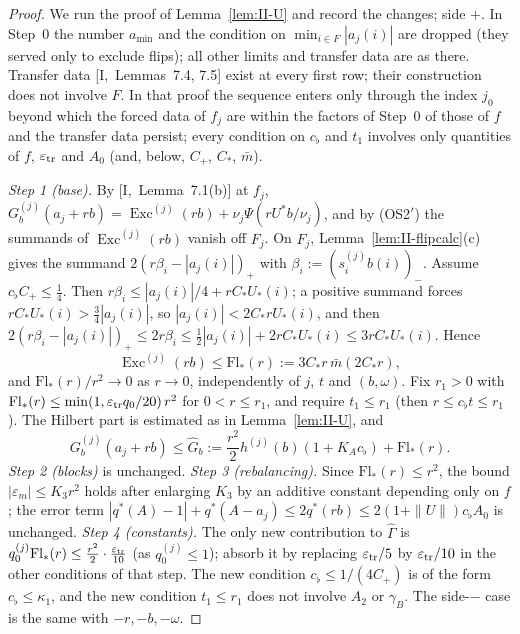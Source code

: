 \documentclass[10pt]{amsart}
\theoremstyle{definition}
\theoremstyle{remark}
\newcommand{\Exc}{\operatorname{Exc}}
\begin{document}
\begin{proof}
We run the proof of Lemma~\ref{lem:II-U} and record the changes; side $+$.
In Step~0 the number $a_{\min}$ and the condition on
$\min_{i\in F}|a_j(i)|$ are dropped (they served only to exclude flips); all
other limits and transfer data are as there.  Transfer data
[I,~Lemmas~7.4, 7.5] exist at every first row; their construction does not
involve $F$.  In that proof the sequence enters only through the index
$j_0$ beyond which the forced data of $f_j$ are within the factors of Step~0
of those of $f$ and the transfer data persist; every condition on $c_\flat$
and $t_1$ involves only quantities of $f$, $\varepsilon_{\rm tr}$ and $A_0$
(and, below, $C_+$, $C_*$, $\bar m$).

\emph{Step 1 (base).}  By [I,~Lemma~7.1(b)] at $f_j$, $G^{(j)}_b(a_j+rb)=
\Exc^{(j)}(rb)+\nu_j\Psi(rU^*b/\nu_j)$, and by (OS2$'$) the summands of
$\Exc^{(j)}(rb)$ vanish off $F_j$.  On $F_j$, Lemma~\ref{lem:II-flipcalc}(c)
gives the summand $2(r\beta_i-|a_j(i)|)_+$ with $\beta_i:=(s^{(j)}_ib(i))_-$.
Assume $c_\flat C_+\le\frac14$.  Then $r\beta_i\le|a_j(i)|/4+rC_*U_*(i)$; a
positive summand forces $rC_*U_*(i)>\frac34|a_j(i)|$, so $|a_j(i)|<2C_*rU_*(i)$,
and then $2(r\beta_i-|a_j(i)|)_+\le2r\beta_i\le\frac12|a_j(i)|+2rC_*U_*(i)\le
3rC_*U_*(i)$.  Hence
\[
 \Exc^{(j)}(rb)\le\mathrm{Fl}_*(r):=3C_*r\,\bar m(2C_*r),
\]
and $\mathrm{Fl}_*(r)/r^2\to0$ as $r\to0$, independently of $j$, $t$ and
$(b,\omega)$.  Fix $r_1>0$ with $\mathrm{Fl}_*(r)\le\min(1,\varepsilon_{\rm tr}
q_0/20)\,r^2$ for $0<r\le r_1$, and require $t_1\le r_1$ (then $r\le
c_\flat t\le r_1$).  The Hilbert part is estimated as in
Lemma~\ref{lem:II-U}, and
\[
 G^{(j)}_b(a_j+rb)\le\hat G_b:=\frac{r^2}2h^{(j)}(b)(1+K_Ac_\flat)+
 \mathrm{Fl}_*(r).
\]
\emph{Step 2 (blocks)} is unchanged.  \emph{Step 3 (rebalancing).}  Since
$\mathrm{Fl}_*(r)\le r^2$, the bound $|\varepsilon_m|\le K_3r^2$ holds after
enlarging $K_3$ by an additive constant depending only on $f$; the error
term $|q^*(A)-1|+q^*(A-a_j)\le2q^*(rb)\le2(1+\|U\|)c_\flat A_0$ is
unchanged.  \emph{Step 4 (constants).}  The only new contribution to
$\hat\Gamma$ is $q^{(j)}_0\mathrm{Fl}_*(r)\le\frac{r^2}2\cdot
\frac{\varepsilon_{\rm tr}}{10}$ (as $q^{(j)}_0\le1$); absorb it by replacing
$\varepsilon_{\rm tr}/5$ by $\varepsilon_{\rm tr}/10$ in the other conditions
of that step.  The new condition $c_\flat\le1/(4C_+)$ is of the form
$c_\flat\le\kappa_1$, and the new condition $t_1\le r_1$ does not involve
$A_2$ or $\gamma_B$.  The side-$-$ case is the same with $-r,-b,-\omega$.
\end{proof}
\end{document}
